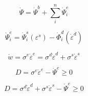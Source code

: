 \documentclass[12pt]{article}
\renewcommand{\d}{\text{d}}
\newcommand{\der}[2]{\dfrac{\text{d} #1}{\text{d} #2}}
\begin{document}
\begin{equation}
	\dot{\Psi} = \dot{\Psi}^{b} + \sum_{i}^{n}  \dot{\Psi}^{e}_{i}
\end{equation}
%
%
%
%
%


\begin{equation}
	\dot{\Psi}^{e}_{i} = \dot{\Psi}^{s}_{i}(\varepsilon^{s}) - \dot{\Phi}^{d}_{i}(\dot{\varepsilon}^{d})
\end{equation}

\begin{equation}
	\dot{w} = \sigma^{e}\dot{\varepsilon}^{e} = \sigma^{d}\dot{\varepsilon}^{d} + \sigma^{s}\dot{\varepsilon}^{s}
\end{equation}

%
%


\begin{equation}
	D = \sigma^{e}\dot{\varepsilon}^{e} - \dot{\Psi}^{e} \geq 0
\end{equation}


\begin{equation}
	D = \sigma^{d}\dot{\varepsilon}^{d} + \sigma^{s}\dot{\varepsilon}^{s} - \dot{\Psi}^{e} \geq 0
\end{equation}
\end{document}
